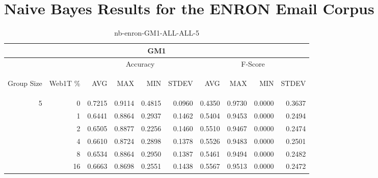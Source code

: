 \chapter{Naive Bayes Results for the ENRON Email Corpus}

\begin{center}
\begin{table}[htbp]
\begin{tabular}{ | r | r | r | r | r | r | r | r | r | r |}
\hline
\multicolumn{10}{|c|}{GM1}\\
\hline
 & & \multicolumn{4}{|c|}{Accuracy} & \multicolumn{4}{|c|}{F-Score}\\ \cline{3-10}
\begin{sideways}Group Size\end{sideways} & \begin{sideways}Web1T \%\end{sideways} & \begin{sideways}AVG\end{sideways} & \begin{sideways}MAX\end{sideways} & \begin{sideways}MIN\end{sideways} & \begin{sideways}STDEV\end{sideways} & \begin{sideways}AVG\end{sideways} & \begin{sideways}MAX\end{sideways} & \begin{sideways}MIN\end{sideways} & \begin{sideways}STDEV\end{sideways}\\
\hline
\multirow{6}{*}{5}
 & 0 & 0.7215 & 0.9114 & 0.4815 & 0.0960 & 0.4350 & 0.9730 & 0.0000 & 0.3637\\ \cline{2-10}
 & 1 & 0.6441 & 0.8864 & 0.2937 & 0.1462 & 0.5404 & 0.9453 & 0.0000 & 0.2494\\ \cline{2-10}
 & 2 & 0.6505 & 0.8877 & 0.2256 & 0.1460 & 0.5510 & 0.9467 & 0.0000 & 0.2474\\ \cline{2-10}
 & 4 & 0.6610 & 0.8724 & 0.2898 & 0.1378 & 0.5526 & 0.9483 & 0.0000 & 0.2501\\ \cline{2-10}
 & 8 & 0.6534 & 0.8864 & 0.2950 & 0.1387 & 0.5461 & 0.9494 & 0.0000 & 0.2482\\ \cline{2-10}
 & 16 & 0.6663 & 0.8698 & 0.2551 & 0.1438 & 0.5567 & 0.9513 & 0.0000 & 0.2472\\ \cline{2-10}
\hline
\end{tabular}
\caption{nb-enron-GM1-ALL-ALL-5}
\end{table}
\end{center}


